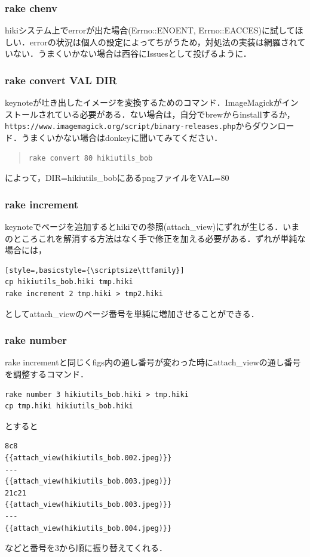 \subsubsection{rake chenv}
hikiシステム上でerrorが出た場合(Errno::ENOENT, Errno::EACCES)に試してほしい．errorの状況は個人の設定によってちがうため，対処法の実装は網羅されていない．うまくいかない場合は西谷にIssuesとして投げるように．

\subsubsection{rake convert VAL DIR}
keynoteが吐き出したイメージを変換するためのコマンド．ImageMagickがインストールされている必要がある．ない場合は，自分でbrewからinstallするか，\verb|https://www.imagemagick.org/script/binary-releases.php|からダウンロード．うまくいかない場合はdonkeyに聞いてみてください．
\begin{quote}\begin{verbatim}
rake convert 80 hikiutils_bob
\end{verbatim}\end{quote}
によって，DIR=hikiutils\_bobにあるpngファイルをVAL=80%

\subsubsection{rake increment}
keynoteでページを追加するとhikiでの参照(attach\_view)にずれが生じる．いまのところこれを解消する方法はなく手で修正を加える必要がある．ずれが単純な場合には，
\begin{lstlisting}[style=,basicstyle={\scriptsize\ttfamily}]
cp hikiutils_bob.hiki tmp.hiki
rake increment 2 tmp.hiki > tmp2.hiki
\end{lstlisting}
としてattach\_viewのページ番号を単純に増加させることができる．

\subsubsection{rake number}
rake incrementと同じくfigs内の通し番号が変わった時にattach\_viewの通し番号を調整するコマンド．
\begin{lstlisting}[style=customCsh,basicstyle={\scriptsize\ttfamily}]
rake number 3 hikiutils_bob.hiki > tmp.hiki
cp tmp.hiki hikiutils_bob.hiki
\end{lstlisting}
とすると
\begin{lstlisting}[style=customCsh,basicstyle={\scriptsize\ttfamily}]
8c8
{{attach_view(hikiutils_bob.002.jpeg)}}
---
{{attach_view(hikiutils_bob.003.jpeg)}}
21c21
{{attach_view(hikiutils_bob.003.jpeg)}}
---
{{attach_view(hikiutils_bob.004.jpeg)}}
\end{lstlisting}
などと番号を3から順に振り替えてくれる．

